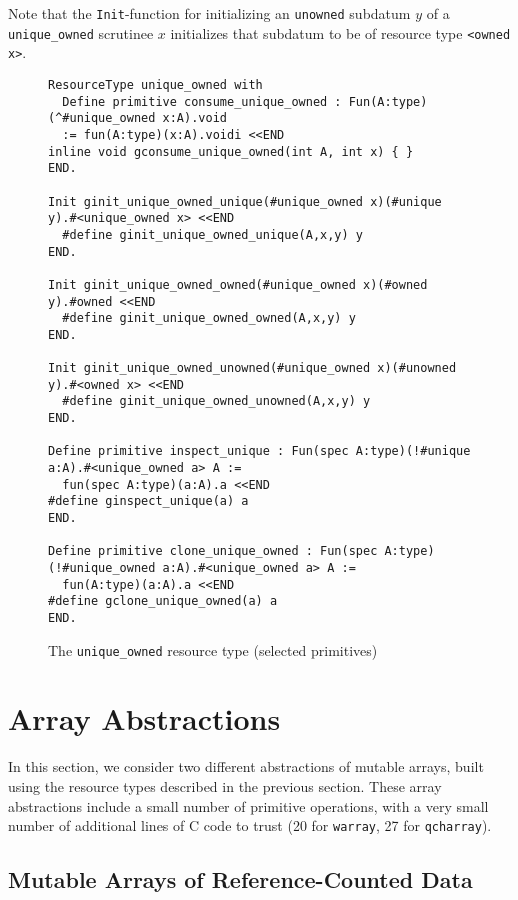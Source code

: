 \documentclass[9pt,natbib]{sigplanconf}
\begin{document}
Note that the \texttt{Init}-function for initializing an
\texttt{unowned} subdatum $y$ of a \texttt{unique\_owned} scrutinee
$x$ initializes that subdatum to be of resource type \texttt{<owned
  x>}.

\begin{figure*}
\small
\begin{verbatim}
ResourceType unique_owned with
  Define primitive consume_unique_owned : Fun(A:type)(^#unique_owned x:A).void
  := fun(A:type)(x:A).voidi <<END
inline void gconsume_unique_owned(int A, int x) { }
END.

Init ginit_unique_owned_unique(#unique_owned x)(#unique y).#<unique_owned x> <<END
  #define ginit_unique_owned_unique(A,x,y) y
END.

Init ginit_unique_owned_owned(#unique_owned x)(#owned y).#owned <<END
  #define ginit_unique_owned_owned(A,x,y) y
END.

Init ginit_unique_owned_unowned(#unique_owned x)(#unowned y).#<owned x> <<END
  #define ginit_unique_owned_unowned(A,x,y) y
END.

Define primitive inspect_unique : Fun(spec A:type)(!#unique a:A).#<unique_owned a> A :=
  fun(spec A:type)(a:A).a <<END
#define ginspect_unique(a) a
END.

Define primitive clone_unique_owned : Fun(spec A:type)(!#unique_owned a:A).#<unique_owned a> A :=
  fun(A:type)(a:A).a <<END
#define gclone_unique_owned(a) a
END.
\end{verbatim}
\caption{The \texttt{unique\_owned} resource type (selected primitives)}
\label{fig:uniqueowned}
\end{figure*}

\section{Array Abstractions}

In this section, we consider two different abstractions of mutable
arrays, built using the resource types described in the previous
section.  These array abstractions include a small number of primitive
operations, with a very small number of additional lines of C code to
trust (20 for \texttt{warray}, 27 for \texttt{qcharray}).  

\subsection{Mutable Arrays of Reference-Counted Data}
\end{document}

